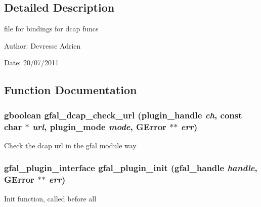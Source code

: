\subsection{Detailed Description}
file for bindings for dcap funcs 

\begin{Desc}
\item[Author:]Devresse Adrien \end{Desc}
\begin{Desc}
\item[Date:]20/07/2011 \end{Desc}


\subsection{Function Documentation}
\subsubsection{\setlength{\rightskip}{0pt plus 5cm}gboolean gfal\_\-dcap\_\-check\_\-url (plugin\_\-handle {\em ch}, const char $\ast$ {\em url}, plugin\_\-mode {\em mode}, GError $\ast$$\ast$ {\em err})}\label{gfal__dcap__plugin__main_8c_20b266be775830f4c92a44b99e1d0dd2}


Check the dcap url in the gfal module way 
\subsubsection{\setlength{\rightskip}{0pt plus 5cm}\bf{gfal\_\-plugin\_\-interface} gfal\_\-plugin\_\-init (gfal\_\-handle {\em handle}, GError $\ast$$\ast$ {\em err})}\label{gfal__dcap__plugin__main_8c_0d53404e0e873535bffdfb3197bb73af}


Init function, called before all 